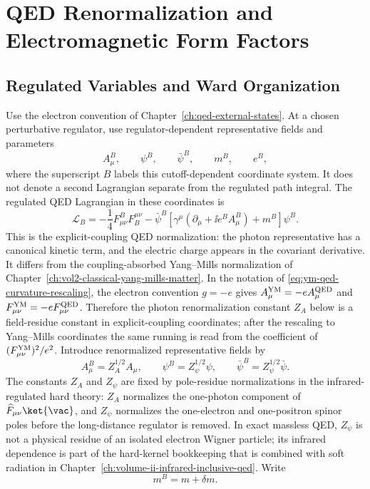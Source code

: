 \chapter{QED Renormalization and Electromagnetic Form Factors}
\label{ch:qed-renormalization-form-factors}
\ConventionsLorentzian


\section{Regulated Variables and Ward Organization}

\begin{definition}
\label{def:qed-regulated-explicit-coupling-coordinates}
Use the electron convention of Chapter~\ref{ch:qed-external-states}.  At a
chosen perturbative regulator, use regulator-dependent representative fields
and parameters
\[
  A_\mu^B,\qquad \psi^B,\qquad \bar\psi^B,\qquad m^B,\qquad e^B,
\]
where the superscript \(B\) labels this cutoff-dependent coordinate system.
It does not denote a second Lagrangian separate from the regulated path
integral.  The regulated QED Lagrangian in these coordinates is
\[
  \mathcal L_B
  =
  -\frac14F^B_{\mu\nu}F_B^{\mu\nu}
  -
  \bar\psi^B
  \left[
    \gamma^\mu(\partial_\mu+\ii e^B A_\mu^B)+m^B
  \right]\psi^B .
\]
This is the explicit-coupling QED normalization: the photon representative has
a canonical kinetic term, and the electric charge appears in the covariant
derivative.  It differs from the coupling-absorbed Yang--Mills normalization of
Chapter~\ref{ch:vol2-classical-yang-mills-matter}.  In the notation of
\eqref{eq:ym-qed-curvature-rescaling}, the electron convention \(g=-e\) gives
\(A_\mu^{\rm YM}=-eA_\mu^{\rm QED}\) and
\(F_{\mu\nu}^{\rm YM}=-eF_{\mu\nu}^{\rm QED}\).  Therefore the photon
renormalization constant \(Z_A\) below is a field-residue constant in
explicit-coupling coordinates; after the rescaling to Yang--Mills coordinates
the same running is read from the coefficient of
\((F_{\mu\nu}^{\rm YM})^2/e^2\).
Introduce renormalized representative fields by
\[
  A_\mu^B=Z_A^{1/2}A_\mu,\qquad
  \psi^B=Z_\psi^{1/2}\psi,\qquad
  \bar\psi^B=Z_\psi^{1/2}\bar\psi .
\]
The constants \(Z_A\) and \(Z_\psi\) are fixed by pole-residue
normalizations in the infrared-regulated hard theory: \(Z_A\) normalizes the
one-photon component of \(\widehat F_{\mu\nu}\ket{\vac}\), and \(Z_\psi\)
normalizes the one-electron and one-positron spinor poles before the
long-distance regulator is removed.  In exact massless QED, \(Z_\psi\) is not
a physical residue of an isolated electron Wigner particle; its infrared
dependence is part of the hard-kernel bookkeeping that is combined with soft
radiation in Chapter~\ref{ch:volume-ii-infrared-inclusive-qed}. Write
\[
  m^B=m+\delta m .
\]


\end{definition}
